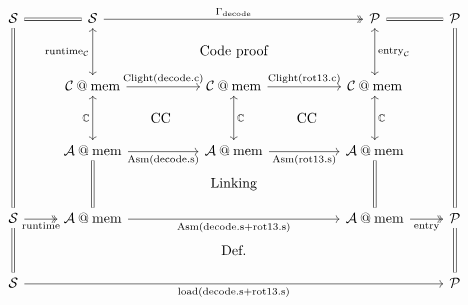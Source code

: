 \documentclass[aspectratio=1610,mathserif]{beamer}
\newcommand{\kw}[1]{\ensuremath{ \mathrm{#1} }}
\begin{document}
\begin{frame}[fragile]
  \[
    \begin{tikzcd}[row sep=small,column sep=small]
      \mathcal{S} \ar[rr,equal] \ar[dddddd, equal]
      &&
      \mathcal{S} \ar[rrrr, twoheadrightarrow, "\Gamma_\kw{decode}"]
         \ar[dd, leftrightarrow, "\kw{runtime}_\mathcal{C}"']
      &&
      &&
      \mathcal{P} \ar[rr, equal]
        \ar[dd, "\kw{entry}_\mathcal{C}", leftrightarrow]
      &&
      \mathcal{P} \ar[dddddd,equal]
      \\
      && && \text{Code proof} && &&
      \\
      &&
      \mathcal{C} \mathbin@ \kw{mem} \ar[rr, "\kw{Clight}(\kw{decode.c})"]
      \ar[dd, leftrightarrow, "\mathbb{C}"']
      &&
      \mathcal{C} \mathbin@ \kw{mem} \ar[rr, "\kw{Clight}(\kw{rot13.c})"]
      \ar[dd, leftrightarrow, "\mathbb{C}"]
      &&
      \mathcal{C} \mathbin@ \kw{mem}
      \ar[dd, leftrightarrow, "\mathbb{C}"]
      \\
      &  & & \text{CC} & &\text{CC} & & &
      \\
      &&
      \mathcal{A} \mathbin@ \kw{mem} \ar[rr, "\kw{Asm}(\kw{decode.s})"']
        \ar[dd, equal]
      &&
      \mathcal{A} \mathbin@ \kw{mem} \ar[rr, "\kw{Asm}(\kw{rot13.s})"']
      &&
      \mathcal{A} \mathbin@ \kw{mem}
        \ar[dd, equal]
      \\
      && && \text{Linking} && &&
      \\
      \mathcal{S} \ar[rr, "\kw{runtime}"', twoheadrightarrow] \ar[dd,equal] &&
      \mathcal{A} \mathbin@ \kw{mem} \ar[rrrr, "\kw{Asm}(\kw{decode.s} + \kw{rot13.s})"'] &&&&
      \mathcal{A} \mathbin@ \kw{mem} \ar[rr, "\kw{entry}"', twoheadrightarrow] &&
      \mathcal{P} \ar[dd,equal]
      \\
      && && \text{Def.} && &&
      \\
      \mathcal{S} \ar[rrrrrrrr, "\kw{load}(\kw{decode.s} + \kw{rot13.s})"']
      && && && &&
      \mathcal{P}
    \end{tikzcd}
  \]
\end{frame}
\end{document}
